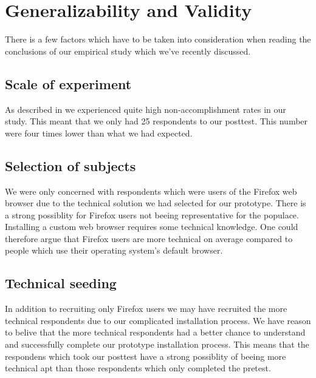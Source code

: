 \section{Generalizability and Validity}

There is a few factors which have to be taken into consideration when reading
the conclusions of our empirical study which we've recently discussed.

\subsection{Scale of experiment}

As described in 
we experienced quite high non-accomplishment rates in our study. This meant
that we only had 25 respondents to our posttest. This number were four times
lower than what we had expected.%

\subsection{Selection of subjects}

We were only
concerned with respondents which were users of the Firefox web browser
due to the technical solution we had selected for our prototype.
There is a strong possiblity for Firefox users not beeing representative for
the \urort{} populace. Installing a custom web browser%
requires some technical knowledge. One could therefore argue that Firefox
users are more technical on average compared to people which use their
operating system's default browser.

\subsection{Technical seeding}

In addition to recruiting only Firefox users we may have recruited the more
technical respondents due to our complicated installation process. We have
reason to belive that the more technical respondents had a better chance to
understand and successfully complete our prototype installation process. This
means that the respondens which took our posttest have a strong possiblity of
beeing more technical apt than those respondents which only completed the
pretest.

